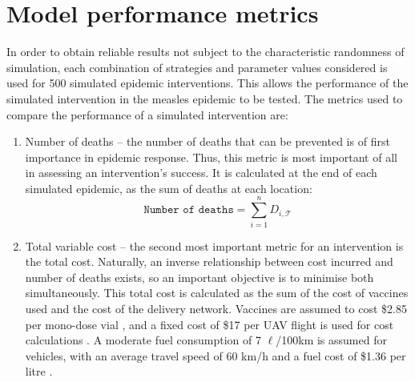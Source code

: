 \section{Model performance metrics}
\label{sec:meth_sim_res}
In order to obtain reliable results not subject to the characteristic randomness of simulation, each combination of strategies and parameter values considered is used for 500 simulated epidemic interventions. This allows the performance of the simulated intervention in the measles epidemic to be tested. The metrics used to compare the performance of a simulated intervention are:
\begin{enumerate}
    \item Number of deaths -- the number of deaths that can be prevented is of first importance in epidemic response. Thus, this metric is most important of all in assessing an intervention's success. It is calculated at the end of each simulated epidemic, as the sum of deaths at each location: $$\texttt{Number of deaths} = \sum^{n}_{i=1} D_{i,\mathcal{T}}$$
    \item Total variable cost -- the second most important metric for an intervention is the total cost. Naturally, an inverse relationship between cost incurred and number of deaths exists, so an important objective is to minimise both simultaneously. This total cost is calculated as the sum of the cost of vaccines used and the cost of the delivery network. Vaccines are assumed to cost \$2.85 per mono-dose vial \cite{unicef_2019}, and a fixed cost of \$17 per UAV flight is used for cost calculations \cite{ackerman_koziol_2019}. A moderate fuel consumption of 7 $\ell$/100km is assumed for vehicles, with an average travel speed of 60 km/h and a fuel cost of \$1.36 per litre \cite{globalpetrolprices}.
\end{enumerate}

